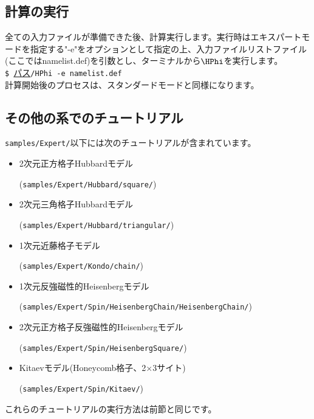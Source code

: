 \subsection{計算の実行}
全ての入力ファイルが準備できた後、計算実行します。実行時はエキスパートモードを指定する"-e"をオプションとして指定の上、入力ファイルリストファイル(ここではnamelist.def)を引数とし、ターミナルから$\HPhi$を実行します。\\
\verb|$ |\underline{パス}\verb|/HPhi -e namelist.def|
~\\
計算開始後のプロセスは、スタンダードモードと同様になります。

\subsection{その他の系でのチュートリアル}

\verb|samples/Expert/|以下には次のチュートリアルが含まれています。

\begin{itemize}
\item 2次元正方格子Hubbardモデル

  (\verb|samples/Expert/Hubbard/square/|)
\item 2次元三角格子Hubbardモデル

  (\verb|samples/Expert/Hubbard/triangular/|)
\item 1次元近藤格子モデル

  (\verb|samples/Expert/Kondo/chain/|)
\item 1次元反強磁性的Heisenbergモデル

  (\verb|samples/Expert/Spin/HeisenbergChain/HeisenbergChain/|)
\item 2次元正方格子反強磁性的Heisenbergモデル

  (\verb|samples/Expert/Spin/HeisenbergSquare/|)
\item Kitaevモデル(Honeycomb格子、2$\times$3サイト)

  (\verb|samples/Expert/Spin/Kitaev/|)

\end{itemize}

これらのチュートリアルの実行方法は前節と同じです。
\newpage
